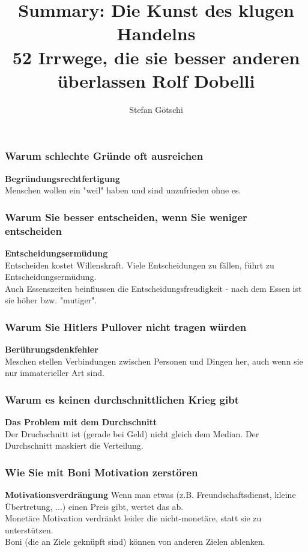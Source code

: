 \documentclass[a4paper, twocolumn]{article}
\title{Summary: Die Kunst des klugen Handelns \\
	\large
	52 Irrwege, die sie besser anderen überlassen
	Rolf Dobelli}
\author{Stefan Götschi}
\begin{document}
\maketitle

\subsubsection*{Warum schlechte Gründe oft ausreichen}
\textbf{Begründungsrechtfertigung}\\
Menschen wollen ein "weil" haben und sind unzufrieden ohne es.

\subsubsection*{Warum Sie besser entscheiden, wenn Sie weniger entscheiden}
\textbf{Entscheidungsermüdung}\\
Entscheiden kostet Willenskraft. Viele Entscheidungen zu fällen, führt zu Entscheidungsermüdung.\\
Auch Essenszeiten beinflussen die Entscheidungsfreudigkeit - nach dem Essen ist sie höher bzw. "mutiger".

\subsubsection*{Warum Sie Hitlers Pullover nicht tragen würden}
\textbf{Berührungsdenkfehler}\\
Meschen stellen Verbindungen zwischen Personen und Dingen her, auch wenn sie nur immaterieller Art sind.

\subsubsection*{Warum es keinen durchschnittlichen Krieg gibt}
\textbf{Das Problem mit dem Durchschnitt}\\
Der Druchschnitt ist (gerade bei Geld) nicht gleich dem Median. Der Durchschnitt maskiert die Verteilung.

\subsubsection*{Wie Sie mit Boni Motivation zerstören}
\textbf{Motivationsverdrängung}
Wenn man etwas (z.B. Freundschaftsdienst, kleine Übertretung, ...) einen Preis gibt, wertet das ab.\\
Monetäre Motivation verdränkt leider die nicht-monetäre, statt sie zu unterstützen.\\
Boni (die an Ziele geknüpft sind) können von anderen Zielen ablenken.
\end{document}
